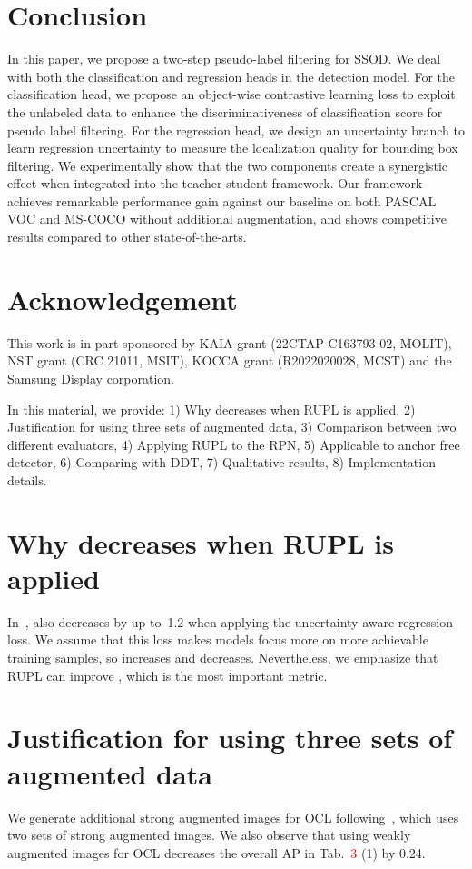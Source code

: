 \documentclass{bmvc2k}
\begin{document}
\section{Conclusion}
\label{sec:con}
In this paper, we propose a two-step pseudo-label filtering for SSOD. 
We deal with both the classification and regression heads in the detection model. For the classification head, we propose an object-wise contrastive learning loss to exploit the unlabeled data to enhance the discriminativeness of classification score for pseudo label filtering. 
For the regression head, we design an uncertainty branch to learn regression uncertainty to measure the localization quality for bounding box filtering. 
We experimentally show that the two components create a synergistic effect when integrated into the teacher-student framework. 
Our framework achieves remarkable performance gain against our baseline on both PASCAL VOC and MS-COCO without additional augmentation, and shows competitive results compared to other state-of-the-arts.

\section*{Acknowledgement}
This work is in part sponsored by KAIA grant (22CTAP-C163793-02, MOLIT), NST grant (CRC 21011, MSIT), KOCCA grant (R2022020028, MCST) and the Samsung Display corporation.



\newpage
\appendix

In this material, we provide: 
1) Why  decreases when RUPL is applied,
2) Justification for using three sets of augmented data,
3) Comparison between two different evaluators,
4) Applying RUPL to the RPN,
5) Applicable to anchor free detector,
6) Comparing with DDT,
7) Qualitative results,
8) Implementation details.

\section{Why  decreases when RUPL is applied}
In~\cite{box_regression_uncertainty},  also decreases by up to~1.2 when applying the uncertainty-aware regression loss. We assume that this loss makes models focus more on more achievable training samples, so  increases and  decreases. Nevertheless, we emphasize that RUPL can improve , which is the most important metric.

\section{Justification for using three sets of augmented data} 
We generate additional strong augmented images for OCL following~\cite{simclr}, which uses two sets of strong augmented images. We also observe that using weakly augmented images for OCL decreases the overall AP in Tab.~\textcolor{red}{3} (1) by 0.24. 
\end{document}
